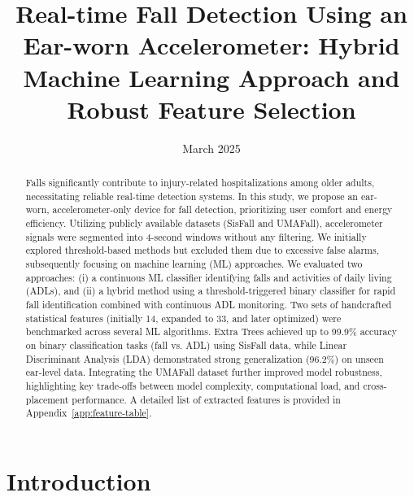 \documentclass[conference]{IEEEtran}
\title{Real-time Fall Detection Using an Ear-worn Accelerometer: Hybrid Machine Learning Approach and Robust Feature Selection}
\author{\IEEEauthorblockN{
Ali Shirazi, Amirmasoud Jafari}

\IEEEauthorblockA{
a.shirazi@st.hanze.nl, a.jafari@st.hanze.nl}}
\date{March 2025}
\begin{document}
\maketitle

\thispagestyle{plain}
\pagestyle{plain}

\begin{abstract}
Falls significantly contribute to injury-related hospitalizations among older adults, necessitating reliable real-time detection systems. In this study, we propose an ear-worn, accelerometer-only device for fall detection, prioritizing user comfort and energy efficiency. Utilizing publicly available datasets (SisFall and UMAFall), accelerometer signals were segmented into 4-second windows without any filtering. We initially explored threshold-based methods but excluded them due to excessive false alarms, subsequently focusing on machine learning (ML) approaches. We evaluated two approaches: (i) a continuous ML classifier identifying falls and activities of daily living (ADLs), and (ii) a hybrid method using a threshold-triggered binary classifier for rapid fall identification combined with continuous ADL monitoring. Two sets of handcrafted statistical features (initially 14, expanded to 33, and later optimized) were benchmarked across several ML algorithms. Extra Trees achieved up to 99.9\% accuracy on binary classification tasks (fall vs. ADL) using SisFall data, while Linear Discriminant Analysis (LDA) demonstrated strong generalization (96.2\%) on unseen ear-level data. Integrating the UMAFall dataset further improved model robustness, highlighting key trade-offs between model complexity, computational load, and cross-placement performance. A detailed list of extracted features is provided in Appendix~\ref{app:feature-table}.
\end{abstract}



\section{Introduction}
\end{document}
